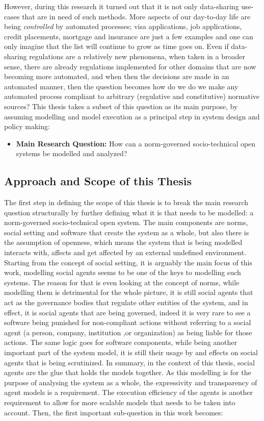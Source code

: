However, during this research it turned out that it is not only data-sharing use-cases that are in need of such methods. More aspects of our day-to-day life are being \textit{controlled} by automated processes; visa applications, job applications, credit placements, mortgage and insurance are just a few examples and one can only imagine that the list will continue to grow as time goes on. Even if data-sharing regulations are a relatively new phenomena, when taken in a broader sense, there are already regulations implemented for other domains that are now becoming more automated, and when then the decisions are made in an automated manner, then the question becomes how do we do we make any automated process compliant to arbitrary (regulative and constitutive) normative sources? This thesis takes a subset of this question as its main purpose, by assuming modelling and model execution as a principal step in system design and policy making:

\begin{itemize}
    \item \textbf{Main Research Question:} How can a norm-governed socio-technical open systems be modelled and analyzed?
\end{itemize}


\subsection{Approach and Scope of this Thesis}
The first step in defining the scope of this thesis is to break the main research question structurally by further defining what it is that needs to be modelled: a norm-governed socio-technical open system. The main components are norms, social setting and software that create the system as a whole, but also there is the assumption of openness, which means the system that is being modelled interacts with, affects and get affected by an external undefined environment. Starting from the concept of social setting, it is arguably the main focus of this work, modelling social agents seems to be one of the keys to modelling such systems. The reason for that is even looking at the concept of norms, while modelling them is detrimental for the whole picture, it is still social agents that act as the governance bodies that regulate other entities of the system, and in effect, it is social agents that are being governed, indeed it is very rare to see a software being punished for non-compliant actions without referring to a social agent (a person, company, institution ,or organization) as being liable for those actions. The same logic goes for software components, while being another important part of the system model, it is still their usage by and effects on social agents that is being scrutinized. In summary, in the context of this thesis, social agents are the glue that holds the models together. As this modelling is for the purpose of analysing the system as a whole, the expressivity and transparency of agent models is a requirement. The execution efficiency of the agents is another requirement to allow for more scalable models that needs to be taken into account. Then, the first important sub-question in this work becomes:

